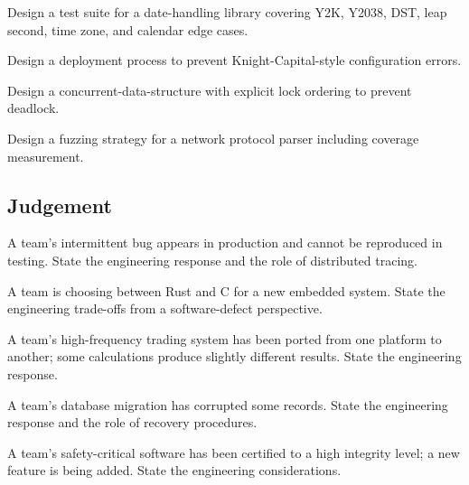 \begin{exercise}
Design a test suite for a date-handling library covering Y2K, Y2038, DST, leap second, time zone, and calendar edge cases.
\end{exercise}

\begin{exercise}
Design a deployment process to prevent Knight-Capital-style configuration errors.
\end{exercise}

\begin{exercise}
Design a concurrent-data-structure with explicit lock ordering to prevent deadlock.
\end{exercise}

\begin{exercise}
Design a fuzzing strategy for a network protocol parser including coverage measurement.
\end{exercise}

\subsection*{Judgement}

\begin{exercise}
A team's intermittent bug appears in production and cannot be reproduced in testing. State the engineering response and the role of distributed tracing.
\end{exercise}

\begin{exercise}
A team is choosing between Rust and C for a new embedded system. State the engineering trade-offs from a software-defect perspective.
\end{exercise}

\begin{exercise}
A team's high-frequency trading system has been ported from one platform to another; some calculations produce slightly different results. State the engineering response.
\end{exercise}

\begin{exercise}
A team's database migration has corrupted some records. State the engineering response and the role of recovery procedures.
\end{exercise}

\begin{exercise}
A team's safety-critical software has been certified to a high integrity level; a new feature is being added. State the engineering considerations.
\end{exercise}

